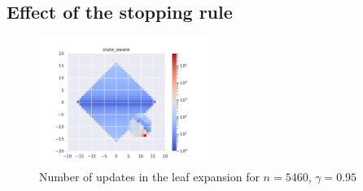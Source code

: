 \documentclass{article}
\begin{document}



\subsection{Effect of the stopping rule}

\begin{figure}[H]
    \centering
    \includegraphics[width=0.49\textwidth]{img/4_updates_state_aware.pdf}
    \caption{Number of updates in the leaf expansion for $n = 5460$, $\gamma=0.95$}
    \label{fig:gw4_updates}
\end{figure}
\end{document}
